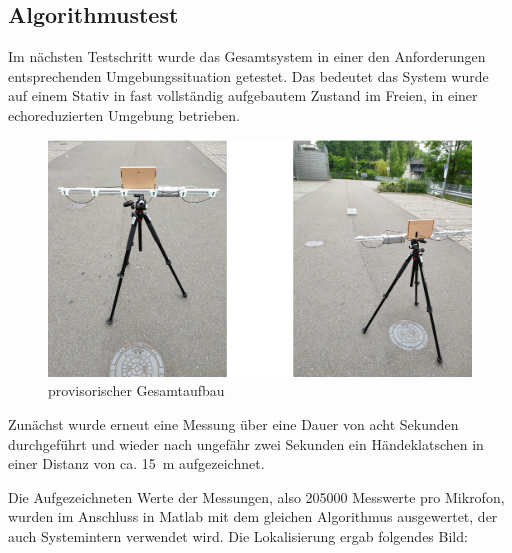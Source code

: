 \subsection{Algorithmustest}

Im nächsten Testschritt wurde das Gesamtsystem in einer den Anforderungen entsprechenden Umgebungssituation getestet. Das bedeutet das System wurde auf einem Stativ in fast vollständig aufgebautem Zustand im Freien, in einer echoreduzierten Umgebung betrieben.

\begin{figure}[h]
	\begin{center}
		\includegraphics[scale=0.1]{Sections/Tests/Gesamtaufbau}
	\end{center}
	\caption{provisorischer Gesamtaufbau}
	\label{fig:Test_4}
\end{figure}

Zunächst wurde erneut eine Messung über eine Dauer von acht Sekunden durchgeführt und wieder nach ungefähr zwei Sekunden ein Händeklatschen in einer Distanz von ca. \SI{15}{m} aufgezeichnet.

Die Aufgezeichneten Werte  der Messungen, also 205000 Messwerte pro Mikrofon, wurden im Anschluss in Matlab mit dem gleichen Algorithmus ausgewertet, der auch Systemintern verwendet wird. Die Lokalisierung ergab folgendes Bild:

